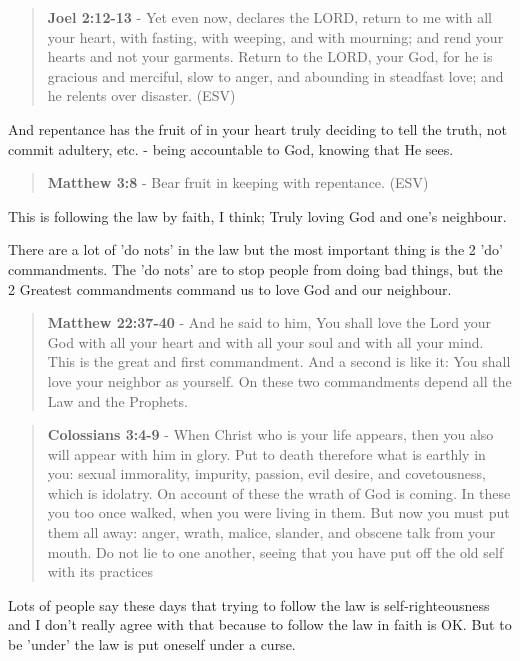 \documentclass[11pt]{article}
\begin{document}
\begin{quote}
\textbf{Joel 2:12-13} - Yet even now, declares the LORD, return to me with all your heart, with fasting, with weeping, and with mourning; and rend your hearts and not your garments. Return to the LORD, your God, for he is gracious and merciful, slow to anger, and abounding in steadfast love; and he relents over disaster. (ESV)
\end{quote}

And repentance has the fruit of in your heart truly deciding to tell the truth, not commit adultery, etc. - being accountable to God, knowing that He sees.

\begin{quote}
\textbf{Matthew 3:8} - Bear fruit in keeping with repentance. (ESV)
\end{quote}

This is following the law by faith, I think; Truly loving God and one's neighbour.

There are a lot of 'do nots' in the law but the most important thing is the 2 'do' commandments.
The 'do nots' are to stop people from doing bad things, but the 2 Greatest commandments command us to love God and our neighbour.

\begin{quote}
\textbf{Matthew 22:37-40} - And he said to him, You shall love the Lord your God with all your heart and with all your soul and with all your mind. This is the great and first commandment. And a second is like it: You shall love your neighbor as yourself. On these two commandments depend all the Law and the Prophets.
\end{quote}

\begin{quote}
\textbf{Colossians 3:4-9} - When Christ who is your life appears, then you also will appear with him in glory. Put to death therefore what is earthly in you: sexual immorality, impurity, passion, evil desire, and covetousness, which is idolatry. On account of these the wrath of God is coming. In these you too once walked, when you were living in them. But now you must put them all away: anger, wrath, malice, slander, and obscene talk from your mouth. Do not lie to one another, seeing that you have put off the old self with its practices
\end{quote}

Lots of people say these days that trying to follow the law is self-righteousness and I don't really agree with that because to follow the law in faith is OK.
But to be 'under' the law is put oneself under a curse.
\end{document}
